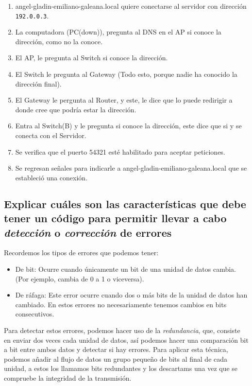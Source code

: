 \documentclass[spanish,12pt,letterpaper]{article}
\begin{document}
\begin{itemize}
  \begin{enumerate}
  \item angel-gladin-emiliano-galeana.local quiere conectarse al servidor con
    dirección \texttt{192.0.0.3}.
  \item La computadora (PC(down)), pregunta al DNS en el AP si conoce la
    dirección, como no la conoce.
  \item El AP, le pregunta al Switch si conoce la dirección.
  \item El Switch le pregunta al Gateway (Todo esto, porque nadie ha conocido la
    dirección final).
  \item El Gateway le pergunta al Router, y este, le dice que lo puede redirigir
    a donde cree que podría estar la dirección.
  \item Entra al Switch(B) y le pregunta si conoce la dirección, este dice que si
    y se conecta con el Servidor.
  \item Se verifica que el puerto 54321 esté habilitado para aceptar peticiones.
  \item Se regresan señales para indicarle a angel-gladin-emiliano-galeana.local
    que se estableció una conexión.
  \end{enumerate}
\end{itemize}

\subsection{Explicar cuáles son las características que debe tener un código para
  permitir llevar a cabo \textit{detección} o \textit{corrección} de errores}

Recordemos los tipos de errores que podemos tener:
\begin{itemize}
\item De bit: Ocurre cuando únicamente un bit de una unidad de datos cambia. (Por
  ejemplo, cambia de 0 a 1 o viceversa).
\item De ráfaga: Este error ocurre cuando dos o más bits de la unidad de datos
  han cambiado. En estos errores no necesariamente tenemos cambios en bits
  consecutivos.
\end{itemize}

Para detectar estos errores, podemos hacer uso de la \textit{redundancia}, que,
consiste en enviar dos veces cada unidad de datos, así podemos hacer una
comparación bit a bit entre ambos datos y detectar si hay errores. Para aplicar
esta técnica, podemos añadir al flujo de datos un grupo pequeño de bits al final
de cada unidad, a estos los llamamos bits redundantes y los descartams una vez
que se compruebe la integridad de la transmisión.
\end{document}
